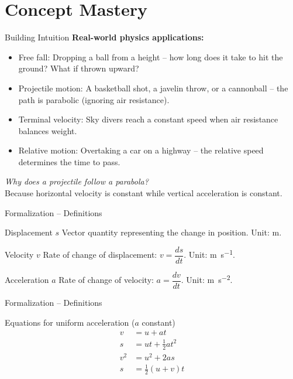 \documentclass{beamer}
\begin{document}
\section{Concept Mastery}

\begin{frame}{Building Intuition}
\textbf{Real-world physics applications:}
\begin{itemize}
    \item \alert{Free fall}: Dropping a ball from a height – how long does it take to hit the ground? What if thrown upward?
    \item \alert{Projectile motion}: A basketball shot, a javelin throw, or a cannonball – the path is parabolic (ignoring air resistance).
    \item \alert{Terminal velocity}: Sky divers reach a constant speed when air resistance balances weight.
    \item \alert{Relative motion}: Overtaking a car on a highway – the relative speed determines the time to pass.
\end{itemize}
\vfill
\textit{Why does a projectile follow a parabola?} \\
Because horizontal velocity is constant while vertical acceleration is constant.
\end{frame}

\begin{frame}{Formalization – Definitions}
\begin{block}{Displacement $s$}
Vector quantity representing the change in position. Unit: \si{\meter}.
\end{block}
\begin{block}{Velocity $v$}
Rate of change of displacement: $v = \dfrac{ds}{dt}$. Unit: \si{\meter\per\second}.
\end{block}
\begin{block}{Acceleration $a$}
Rate of change of velocity: $a = \dfrac{dv}{dt}$. Unit: \si{\meter\per\second\squared}.
\end{block}
\end{frame}

\begin{frame}{Formalization – Definitions}
\begin{block}{Equations for uniform acceleration ($a$ constant)}
\begin{align*}
v &= u + at \\
s &= ut + \tfrac12 at^2 \\
v^2 &= u^2 + 2as \\
s &= \tfrac12 (u+v)t\\
\end{align*}
\end{block}
\end{frame}
\end{document}

